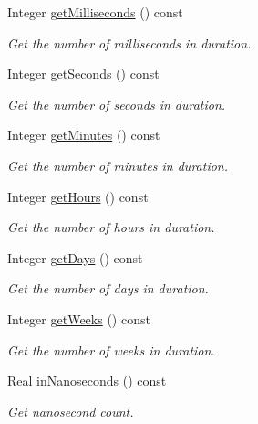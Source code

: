 \begin{DoxyCompactItemize}
Integer \hyperlink{classostk_1_1physics_1_1time_1_1_duration_a4ff289a3d0fb16c73899adcfe381a111}{get\+Milliseconds} () const
\begin{DoxyCompactList}\small\item\em Get the number of milliseconds in duration. \end{DoxyCompactList}\item 
Integer \hyperlink{classostk_1_1physics_1_1time_1_1_duration_aff2319bf58b7c3da9e87ccd88867ffe7}{get\+Seconds} () const
\begin{DoxyCompactList}\small\item\em Get the number of seconds in duration. \end{DoxyCompactList}\item 
Integer \hyperlink{classostk_1_1physics_1_1time_1_1_duration_a59eb18f0275a8683e73b9b86194bf9da}{get\+Minutes} () const
\begin{DoxyCompactList}\small\item\em Get the number of minutes in duration. \end{DoxyCompactList}\item 
Integer \hyperlink{classostk_1_1physics_1_1time_1_1_duration_ac33d36a6a043ad71b0203b02b9ff961b}{get\+Hours} () const
\begin{DoxyCompactList}\small\item\em Get the number of hours in duration. \end{DoxyCompactList}\item 
Integer \hyperlink{classostk_1_1physics_1_1time_1_1_duration_a8902625ed4b1d8d2a23bf7c5e9f886c4}{get\+Days} () const
\begin{DoxyCompactList}\small\item\em Get the number of days in duration. \end{DoxyCompactList}\item 
Integer \hyperlink{classostk_1_1physics_1_1time_1_1_duration_af42d2314c9d99b87ff09cf8470a460cd}{get\+Weeks} () const
\begin{DoxyCompactList}\small\item\em Get the number of weeks in duration. \end{DoxyCompactList}\item 
Real \hyperlink{classostk_1_1physics_1_1time_1_1_duration_a00148c707cda4dc7b93aab5280200cd5}{in\+Nanoseconds} () const
\begin{DoxyCompactList}\small\item\em Get nanosecond count. \end{DoxyCompactList}\item 

\end{DoxyCompactItemize}
